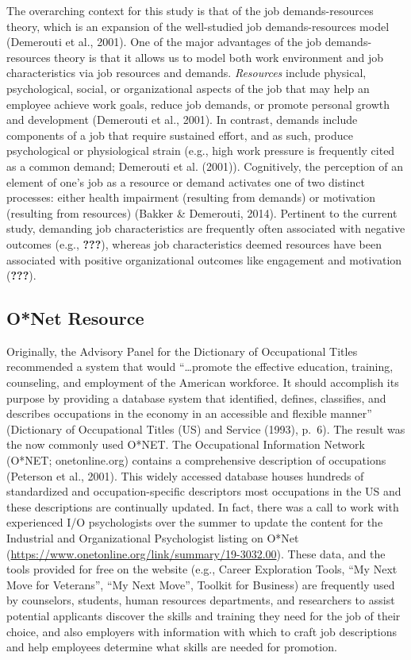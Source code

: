 \documentclass[
  english,
  man]{apa6}
\begin{document}
The overarching context for this study is that of the job demands-resources theory, which is an expansion of the well-studied job demands-resources model (Demerouti et al., 2001). One of the major advantages of the job demands-resources theory is that it allows us to model both work environment and job characteristics via job resources and demands. \emph{Resources} include physical, psychological, social, or organizational aspects of the job that may help an employee achieve work goals, reduce job demands, or promote personal growth and development (Demerouti et al., 2001). In contrast, demands include components of a job that require sustained effort, and as such, produce psychological or physiological strain (e.g., high work pressure is frequently cited as a common demand; Demerouti et al. (2001)).
Cognitively, the perception of an element of one's job as a resource or demand activates one of two distinct processes: either health impairment (resulting from demands) or motivation (resulting from resources) (Bakker \& Demerouti, 2014). Pertinent to the current study, demanding job characteristics are frequently often associated with negative outcomes (e.g., {\textbf{???}}), whereas job characteristics deemed resources have been associated with positive organizational outcomes like engagement and motivation ({\textbf{???}}).

\hypertarget{onet-resource}{%
\subsection{O*Net Resource}\label{onet-resource}}

Originally, the Advisory Panel for the Dictionary of Occupational Titles recommended a system that would \enquote{\ldots promote the effective education, training, counseling, and employment of the American workforce. It should accomplish its purpose by providing a database system that identified, defines, classifies, and describes occupations in the economy in an accessible and flexible manner} (Dictionary of Occupational Titles (US) and Service (1993), p.~6). The result was the now commonly used O*NET. The Occupational Information Network (O*NET; onetonline.org) contains a comprehensive description of occupations (Peterson et al., 2001). This widely accessed database houses hundreds of standardized and occupation-specific descriptors most occupations in the US and these descriptions are continually updated. In fact, there was a call to work with experienced I/O psychologists over the summer to update the content for the Industrial and Organizational Psychologist listing on O*Net (\url{https://www.onetonline.org/link/summary/19-3032.00}). These data, and the tools provided for free on the website (e.g., Career Exploration Tools, \enquote{My Next Move for Veterans}, \enquote{My Next Move}, Toolkit for Business) are frequently used by counselors, students, human resources departments, and researchers to assist potential applicants discover the skills and training they need for the job of their choice, and also employers with information with which to craft job descriptions and help employees determine what skills are needed for promotion.
\end{document}
